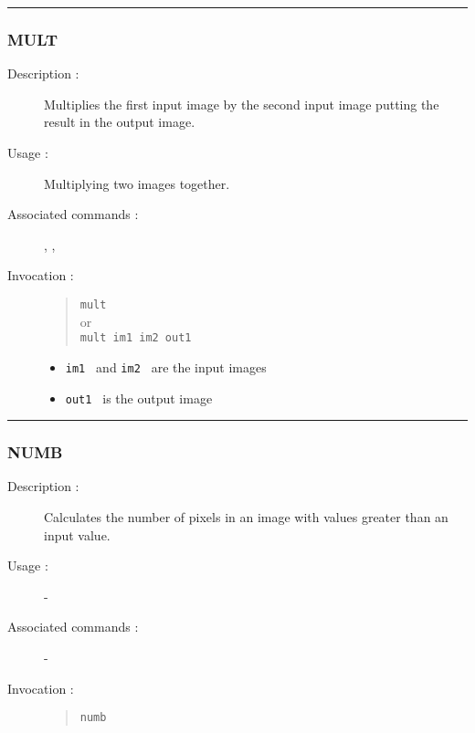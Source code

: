 \hrule 
\subsubsection*{\label{MULT}MULT}

\begin{description}

\item[Description :] Multiplies the first input image by the second
input image putting the result in the output image.

\item[Usage :] Multiplying two images together.

\item[Associated commands :] {\tt {}}, 
{\tt {}}, {\tt {}}

\item[Invocation :]

\begin{quote}{\tt  mult }\\
or \\
{\tt mult im1 im2 out1 }
\end{quote}

\begin{itemize}

\item {\tt im1 } and {\tt im2 } are the input images
\item {\tt out1 } is the output image
\end{itemize}

\end{description}

\hrule 
\subsubsection*{\label{NUMB}NUMB}

\begin{description}

\item[Description :] Calculates the number of pixels in an image with
values greater than an input value.

\item[Usage :] -
\item[Associated commands :] -
\item[Invocation :]

\begin{quote}{\tt  numb }\end{quote}

\end{description}

